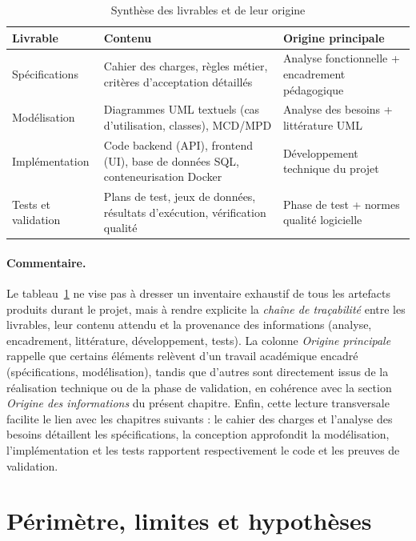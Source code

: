 \begin{table}[htbp]
  \centering
  \renewcommand{\arraystretch}{1.4}
  \setlength{\tabcolsep}{10pt}
  \caption{Synthèse des livrables et de leur origine}
  \label{tab:livrables}
  \begin{tabular}{|p{3.2cm}|p{5.3cm}|p{4.5cm}|}
    \hline
    \textbf{Livrable} & \textbf{Contenu} & \textbf{Origine principale} \\
    \hline
    Spécifications &
    Cahier des charges, règles métier, critères d'acceptation détaillés &
    Analyse fonctionnelle + encadrement pédagogique \\
    \hline
    Modélisation &
    Diagrammes UML textuels (cas d'utilisation, classes), MCD/MPD &
    Analyse des besoins + littérature UML \cite{booch2005} \\
    \hline
    Implémentation &
    Code backend (API), frontend (UI), base de données SQL, conteneurisation Docker &
    Développement technique du projet \\
    \hline
    Tests et validation &
    Plans de test, jeux de données, résultats d'exécution, vérification qualité &
    Phase de test + normes qualité logicielle \cite{ieee1012} \\
    \hline
  \end{tabular}
\end{table}

\paragraph{Commentaire.}
Le tableau~\ref{tab:livrables} ne vise pas à dresser un inventaire exhaustif de tous les artefacts produits durant le projet, mais à rendre explicite la \emph{chaîne de traçabilité} entre les livrables, leur contenu attendu et la provenance des informations (analyse, encadrement, littérature, développement, tests). La colonne \emph{Origine principale} rappelle que certains éléments relèvent d'un travail académique encadré (spécifications, modélisation), tandis que d'autres sont directement issus de la réalisation technique ou de la phase de validation, en cohérence avec la section \emph{Origine des informations} du présent chapitre. Enfin, cette lecture transversale facilite le lien avec les chapitres suivants : le cahier des charges et l'analyse des besoins détaillent les spécifications, la conception approfondit la modélisation, l'implémentation et les tests rapportent respectivement le code et les preuves de validation.

\newpage
\section{Périmètre, limites et hypothèses}

